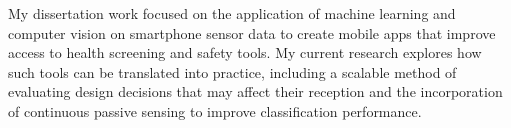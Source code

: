\justify
My dissertation work focused on the application of machine learning and computer vision on smartphone sensor data to create mobile apps that improve access to health screening and safety tools. My current research explores how such tools can be translated into practice, including a scalable method of evaluating design decisions that may affect their reception and the incorporation of continuous passive sensing to improve classification performance.